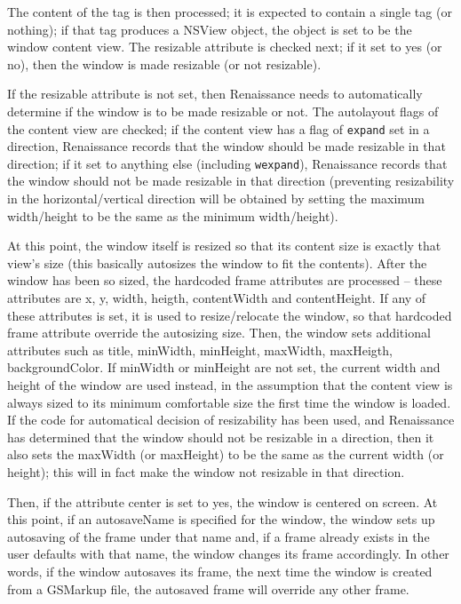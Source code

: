 The content of the tag is then processed; it is expected to contain a
single tag (or nothing); if that tag produces a NSView object, the
object is set to be the window content view.  The resizable attribute
is checked next; if it set to yes (or no), then the window is made
resizable (or not resizable).

If the resizable attribute is not set, then Renaissance needs to
automatically determine if the window is to be made resizable or not.
The autolayout flags of the content view are checked; if the content
view has a flag of \texttt{expand} set in a direction, Renaissance
records that the window should be made resizable in that direction; if
it set to anything else (including \texttt{wexpand}), Renaissance
records that the window should not be made resizable in that direction
(preventing resizability in the horizontal/vertical direction will be
obtained by setting the maximum width/height to be the same as the
minimum width/height).

At this point, the window itself is resized so that its content size
is exactly that view's size (this basically autosizes the window to
fit the contents).  After the window has been so sized, the hardcoded
frame attributes are processed -- these attributes are x, y, width,
heigth, contentWidth and contentHeight.  If any of these attributes is
set, it is used to resize/relocate the window, so that hardcoded frame
attribute override the autosizing size.  Then, the window sets
additional attributes such as title, minWidth, minHeight, maxWidth,
maxHeigth, backgroundColor.  If minWidth or minHeight are not set, the
current width and height of the window are used instead, in the
assumption that the content view is always sized to its minimum
comfortable size the first time the window is loaded.  If the code for
automatical decision of resizability has been used, and Renaissance
has determined that the window should not be resizable in a direction,
then it also sets the maxWidth (or maxHeight) to be the same as the
current width (or height); this will in fact make the window not
resizable in that direction.

Then, if the attribute center is set to yes, the window is centered on
screen.  At this point, if an autosaveName is specified for the
window, the window sets up autosaving of the frame under that name
and, if a frame already exists in the user defaults with that name,
the window changes its frame accordingly.  In other words, if the
window autosaves its frame, the next time the window is created from a
GSMarkup file, the autosaved frame will override any other frame.


